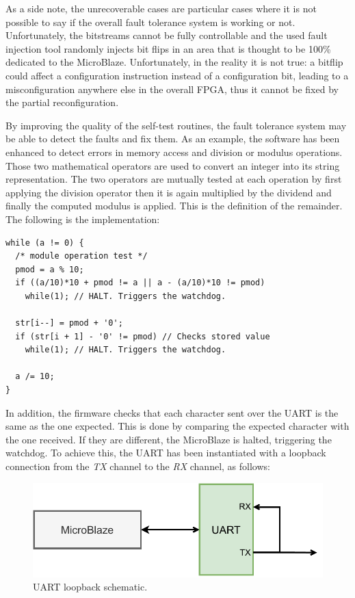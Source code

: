 As a side note, the unrecoverable cases are particular cases where it is not possible to say if the overall fault tolerance system is working or not. Unfortunately, the bitstreams cannot be fully controllable and the used fault injection tool randomly injects bit flips in an area that is thought to be 100\% dedicated to the MicroBlaze. Unfortunately, in the reality it is not true: a bitflip could affect a configuration instruction instead of a configuration bit, leading to a misconfiguration anywhere else in the overall FPGA, thus it cannot be fixed by the partial reconfiguration.\bigskip

By improving the quality of the self-test routines, the fault tolerance system may be able to detect the faults and fix them. As an example, the software has been enhanced to detect errors in memory access and division or modulus operations. Those two mathematical operators are used to convert an integer into its string representation. The two operators are mutually tested at each operation by first applying the division operator then it is again multiplied by the dividend and finally the computed modulus is applied. This is the definition of the remainder. The following is the implementation:

\begin{lstlisting}[style=C]
while (a != 0) {
  /* module operation test */
  pmod = a % 10;
  if ((a/10)*10 + pmod != a || a - (a/10)*10 != pmod) 
    while(1); // HALT. Triggers the watchdog.
  
  str[i--] = pmod + '0';
  if (str[i + 1] - '0' != pmod) // Checks stored value
    while(1); // HALT. Triggers the watchdog.
  
  a /= 10;
}
\end{lstlisting}

In addition, the firmware checks that each character sent over the UART is the same as the one expected. This is done by comparing the expected character with the one received. If they are different, the MicroBlaze is halted, triggering the watchdog. To achieve this, the UART has been instantiated with a loopback connection from the \textit{TX} channel to the \textit{RX} channel, as follows:

\begin{figure}[H]
\centering
\includegraphics[width=0.85\linewidth]{images/chapter5/sch.pdf}
\caption{UART loopback schematic.}
\end{figure}

